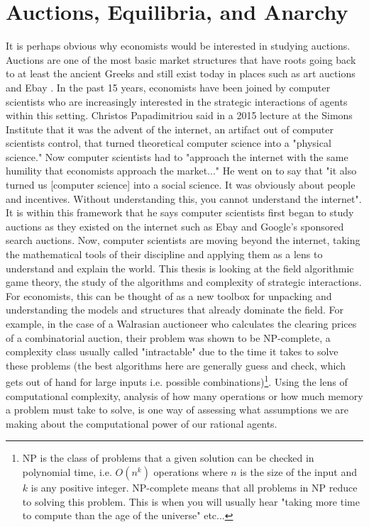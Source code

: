 \documentclass[12pt,twoside]{reedthesis}
\begin{document}
\section{Auctions, Equilibria, and Anarchy}
It is perhaps obvious why economists would be interested in studying auctions. Auctions are one of the most basic market structures that have roots going back to at least the ancient Greeks and still exist today in places such as art auctions and Ebay \citep{Mochon2015}. In the past 15 years, economists have been joined by computer scientists who are increasingly interested in the strategic interactions of agents within this setting. Christos Papadimitriou said in a 2015 lecture at the Simons Institute that it was the advent of the internet, an artifact out of computer scientists control, that turned theoretical computer science into a "physical science." Now computer scientists had to "approach the internet with the same humility that economists approach the market..." He went on to say that "it also turned us [computer science] into a social science. It was obviously about people and incentives. Without understanding this, you cannot understand the internet"\citep{Papadimitriou201}. It is within this framework that he says computer scientists first began to study auctions as they existed on the internet such as Ebay and Google's sponsored search auctions. Now, computer scientists are moving beyond the internet, taking the mathematical tools of their discipline and applying them as a lens to understand and explain the world. This thesis is looking at the field algorithmic game theory, the study of the algorithms and complexity of strategic interactions. For economists, this can be thought of as a new toolbox for unpacking and understanding the models and structures that already dominate the field. For example, in the case of a Walrasian auctioneer who calculates the clearing prices of a combinatorial auction, their problem was shown to be NP-complete, a complexity class usually called "intractable" due to the time it takes to solve these problems (the best algorithms here are generally guess and check, which gets out of hand for large inputs i.e. possible combinations)\citep{Papadimitriou2015}\footnote{NP is the class of problems that a given solution can be checked in polynomial time, i.e. $O(n^k)$ operations where $n$ is the size of the input and $k$ is any positive integer. NP-complete means that all problems in NP reduce to solving this problem. This is when you will usually hear "taking more time to compute than the age of the universe" etc...}. Using the lens of computational complexity, analysis of how many operations or how much memory a problem must take to solve, is one way of assessing what assumptions we are making about the computational power of our rational agents.
\end{document}

